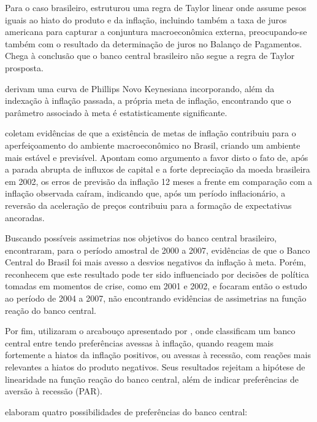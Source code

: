 \documentclass[
	article,			%
	11pt,				%
	oneside,			%
	a4paper,			%
	english,			%
	brazil,				%
	]{abntex2}
\begin{document}
	Para o caso brasileiro,  estruturou uma regra de Taylor linear onde assume pesos iguais ao hiato do produto e da inflação, incluindo também a taxa de juros americana para capturar a conjuntura macroeconômica externa, preocupando-se também com o resultado da determinação de juros no Balanço de Pagamentos. Chega à conclusão que o banco central brasileiro não segue a regra de Taylor prosposta.
	
	 derivam uma curva de Phillips Novo Keynesiana incorporando, além da indexação à inflação passada, a própria meta de inflação, encontrando que o parâmetro associado à meta é estatisticamente significante.
	
	 coletam evidências de que a existência de metas de inflação contribuiu para o aperfeiçoamento do ambiente macroeconômico no Brasil, criando um ambiente mais estável e previsível. Apontam como argumento a favor disto o fato de, após a parada abrupta de influxos de capital e a forte depreciação da moeda brasileira em 2002, os erros de previsão da inflação 12 meses a frente em comparação com a inflação observada caíram, indicando que, após um período inflacionário, a reversão da aceleração de preços contribuiu para a formação de expectativas ancoradas.
	
	Buscando possíveis assimetrias nos objetivos do banco central brasileiro,  encontraram, para o período amostral de 2000 a 2007, evidências de que o Banco Central do Brasil foi mais avesso a desvios negativos da inflação à meta. Porém, reconhecem que este resultado pode ter sido influenciado por decisões de política tomadas em momentos de crise, como em 2001 e 2002, e focaram então o estudo ao período de 2004 a 2007, não encontrando evidências de assimetrias na função reação do banco central.
	
	Por fim,  utilizaram o arcabouço apresentado por , onde classificam um banco central entre tendo preferências avessas à inflação, quando reagem mais fortemente a hiatos da inflação positivos, ou avessas à recessão, com reações mais relevantes a hiatos do produto negativos. Seus resultados rejeitam a hipótese de linearidade na função reação do banco central, além de indicar preferências de aversão à recessão (PAR).
	
	 elaboram quatro possibilidades de preferências do banco central:
	
\end{document}
